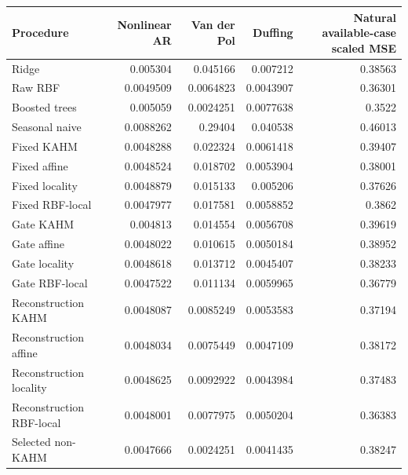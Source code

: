 \begin{tabular}{lrrrr}
\toprule
Procedure & Nonlinear AR & Van der Pol & Duffing & Natural available-case scaled MSE \\
\midrule
Ridge & 0.005304 & 0.045166 & 0.007212 & 0.38563 \\
Raw RBF & 0.0049509 & 0.0064823 & 0.0043907 & 0.36301 \\
Boosted trees & 0.005059 & 0.0024251 & 0.0077638 & 0.3522 \\
Seasonal naive & 0.0088262 & 0.29404 & 0.040538 & 0.46013 \\
Fixed KAHM & 0.0048288 & 0.022324 & 0.0061418 & 0.39407 \\
Fixed affine & 0.0048524 & 0.018702 & 0.0053904 & 0.38001 \\
Fixed locality & 0.0048879 & 0.015133 & 0.005206 & 0.37626 \\
Fixed RBF-local & 0.0047977 & 0.017581 & 0.0058852 & 0.3862 \\
Gate KAHM & 0.004813 & 0.014554 & 0.0056708 & 0.39619 \\
Gate affine & 0.0048022 & 0.010615 & 0.0050184 & 0.38952 \\
Gate locality & 0.0048618 & 0.013712 & 0.0045407 & 0.38233 \\
Gate RBF-local & 0.0047522 & 0.011134 & 0.0059965 & 0.36779 \\
Reconstruction KAHM & 0.0048087 & 0.0085249 & 0.0053583 & 0.37194 \\
Reconstruction affine & 0.0048034 & 0.0075449 & 0.0047109 & 0.38172 \\
Reconstruction locality & 0.0048625 & 0.0092922 & 0.0043984 & 0.37483 \\
Reconstruction RBF-local & 0.0048001 & 0.0077975 & 0.0050204 & 0.36383 \\
Selected non-KAHM & 0.0047666 & 0.0024251 & 0.0041435 & 0.38247 \\
\bottomrule
\end{tabular}
